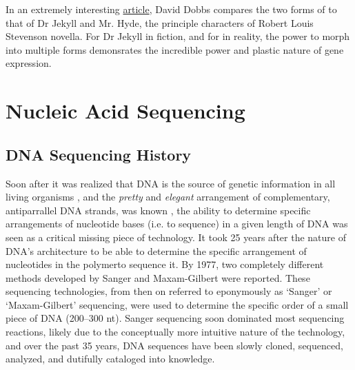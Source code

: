 In an extremely interesting \href{http://aeon.co/magazine/nature-and-cosmos/why-its-time-to-lay-the-selfish-gene-to-rest/}{article}, David Dobbs compares the two forms of \locusts{} to that of Dr Jekyll and Mr. Hyde, the principle characters of Robert Louis Stevenson novella. For Dr Jekyll in fiction, and for \locusts{} in reality, the power to morph into multiple forms demonsrates the incredible power and plastic nature of gene expression. 

\section{Nucleic Acid Sequencing}
\subsection{DNA Sequencing History} %

Soon after it was realized that DNA is the source of genetic information in all living organisms \citep{Watson1953a}, and the \textit{pretty} and \textit{elegant} arrangement of complementary, antiparrallel DNA strands, was known \citep{Watson2012a}, the ability to determine specific arrangements of nucleotide bases (i.e. to sequence) in a given length of DNA was seen as a critical missing piece of technology. It took 25 years after the nature of DNA's architecture to be able to determine the specific arrangement of nucleotides in the polymer\textemdash to sequence it. By 1977, two completely different methods developed by Sanger \citep{Sanger1975a,Sanger1977b} and Maxam-Gilbert \citep{Maxam1977a} were reported. These sequencing technologies, from then on referred to eponymously as ‘Sanger’ or ‘Maxam-Gilbert’ sequencing, were used to determine the specific order of a small piece of DNA (200–300 nt). Sanger sequencing soon dominated most sequencing reactions, likely due to the conceptually more intuitive nature of the technology, and over the past 35 years, DNA sequences have been slowly cloned, sequenced, analyzed, and dutifully cataloged into knowledge.

